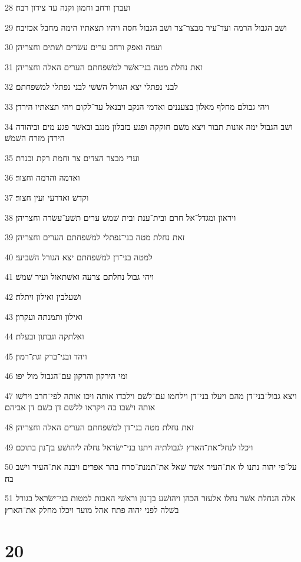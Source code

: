 \par 28 ועברן ורחב וחמון וקנה עד צידון רבה׃
\par 29 ושׁב הגבול הרמה ועד־עיר מבצר־צר ושׁב הגבול חסה ויהיו תצאתיו הימה מחבל אכזיבה׃
\par 30 ועמה ואפק ורחב ערים עשׂרים ושׁתים וחצריהן׃
\par 31 זאת נחלת מטה בני־אשׁר למשׁפחתם הערים האלה וחצריהן׃
\par 32 לבני נפתלי יצא הגורל השׁשׁי לבני נפתלי למשׁפחתם׃
\par 33 ויהי גבולם מחלף מאלון בצעננים ואדמי הנקב ויבנאל עד־לקום ויהי תצאתיו הירדן׃
\par 34 ושׁב הגבול ימה אזנות תבור ויצא משׁם חוקקה ופגע בזבלון מנגב ובאשׁר פגע מים וביהודה הירדן מזרח השׁמשׁ׃
\par 35 וערי מבצר הצדים צר וחמת רקת וכנרת׃
\par 36 ואדמה והרמה וחצור׃
\par 37 וקדשׁ ואדרעי ועין חצור׃
\par 38 ויראון ומגדל־אל חרם ובית־ענת ובית שׁמשׁ ערים תשׁע־עשׂרה וחצריהן׃
\par 39 זאת נחלת מטה בני־נפתלי למשׁפחתם הערים וחצריהן׃
\par 40 למטה בני־דן למשׁפחתם יצא הגורל השׁביעי׃
\par 41 ויהי גבול נחלתם צרעה ואשׁתאול ועיר שׁמשׁ׃
\par 42 ושׁעלבין ואילון ויתלה׃
\par 43 ואילון ותמנתה ועקרון׃
\par 44 ואלתקה וגבתון ובעלת׃
\par 45 ויהד ובני־ברק וגת־רמון׃
\par 46 ומי הירקון והרקון עם־הגבול מול יפו׃
\par 47 ויצא גבול־בני־דן מהם ויעלו בני־דן וילחמו עם־לשׁם וילכדו אותה ויכו אותה לפי־חרב וירשׁו אותה וישׁבו בה ויקראו ללשׁם דן כשׁם דן אביהם׃
\par 48 זאת נחלת מטה בני־דן למשׁפחתם הערים האלה וחצריהן׃
\par 49 ויכלו לנחל־את־הארץ לגבולתיה ויתנו בני־ישׂראל נחלה ליהושׁע בן־נון בתוכם׃
\par 50 על־פי יהוה נתנו לו את־העיר אשׁר שׁאל את־תמנת־סרח בהר אפרים ויבנה את־העיר וישׁב בה׃
\par 51 אלה הנחלת אשׁר נחלו אלעזר הכהן ויהושׁע בן־נון וראשׁי האבות למטות בני־ישׂראל בגורל בשׁלה לפני יהוה פתח אהל מועד ויכלו מחלק את־הארץ׃

\chapter{20}

